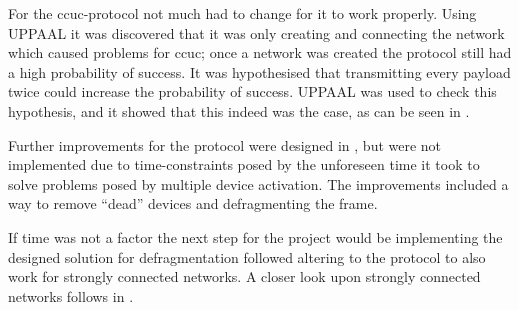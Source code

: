 \bigskip \noindent
For the \acrshort{ccuc}-protocol not much had to change for it to work properly.
Using UPPAAL it was discovered that it was only creating and connecting the network which caused problems for \acrshort{ccuc}; once a network was created the protocol still had a high probability of success.
It was hypothesised that transmitting every payload twice could increase the probability of success.
UPPAAL was used to check this hypothesis, and it showed that this indeed was the case, as can be seen in .

Further improvements for the protocol were designed in , but were not implemented due to time-constraints posed by the unforeseen time it took to solve problems posed by multiple device activation.
The improvements included a way to remove \enquote{dead} devices and defragmenting the frame.

\bigskip \noindent
If time was not a factor the next step for the project would be implementing the designed solution for defragmentation followed altering to the protocol to also work for strongly connected networks.
A closer look upon strongly connected networks follows in .
